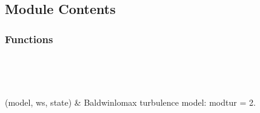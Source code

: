 \documentclass[letterpaper,10pt,english]{sphinxmanual}
\begin{document}
\subsection{Module Contents}
\label{\detokenize{autoapi/BaldwinLomax/index:module-contents}}

\subsubsection{Functions}
\label{\detokenize{autoapi/BaldwinLomax/index:functions}}

\begin{savenotes}\sphinxatlongtablestart\begin{longtable}[c]{}
\hline

\endfirsthead

%
{}\\
\hline

\endhead

\hline
{}\\
\endfoot

\endlastfoot

\sphinxAtStartPar
{\hyperref[\detokenize{autoapi/BaldwinLomax/index:BaldwinLomax.turbulent_viscosity}]{}}(model, ws, state)
&
\sphinxAtStartPar
Baldwin\sphinxhyphen{}lomax turbulence model:  modtur = 2.
\\
\hline
\end{longtable}\sphinxatlongtableend\end{savenotes}
\end{document}
